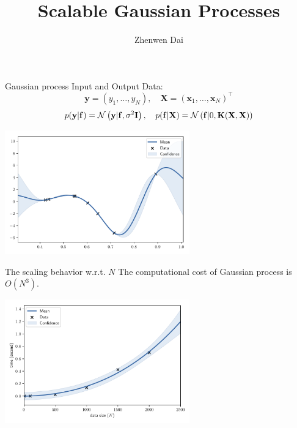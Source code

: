 \documentclass[14pt,aspectratio=1610]{beamer}
\newcommand{\yV}{\mathbf{y}}
\newcommand{\fV}{\mathbf{f}}
\newcommand{\xM}{\mathbf{X}}
\newcommand{\xV}{\mathbf{x}}
\newcommand{\K}{\mathbf{K}}
\newcommand{\I}{\mathbf{I}}
\begin{document}
\title{Scalable Gaussian Processes}
\author{Zhenwen Dai}
\frame{\maketitle}


\begin{frame}{Gaussian process}
Input and Output Data: 
\[
\yV = (y_1, \ldots, y_N), \quad \xM = (\xV_1, \ldots, \xV_N)^\top
\]
\begin{align*}
p(\yV| \fV) = \gaussianDist{\yV}{\fV}{\sigma^2 \I}, \quad p (\fV| \xM) = \gaussianDist{\fV}{0}{\K(\xM, \xM)}
\end{align*}
\begin{center}
\includegraphics[width=0.6\textwidth]{gp_first_example.pdf} 
\end{center}
\end{frame}

\begin{frame}{The scaling behavior w.r.t. $N$}
The computational cost of Gaussian process is $O(N^3)$.
\begin{center}
\includegraphics[width=0.6\textwidth]{gp_scaling.pdf} 
\end{center}
\end{frame}
\end{document}
